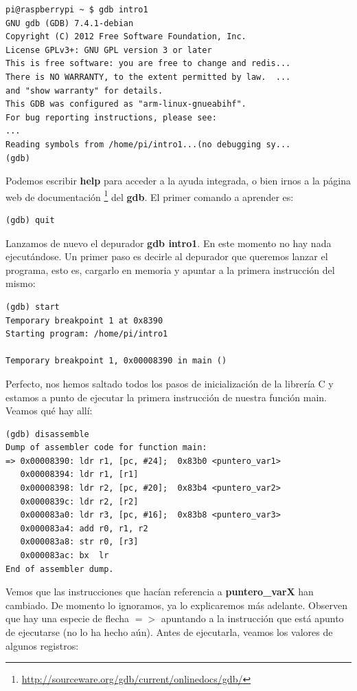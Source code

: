 \begin{lstlisting}
pi@raspberrypi ~ $ gdb intro1
GNU gdb (GDB) 7.4.1-debian
Copyright (C) 2012 Free Software Foundation, Inc.
License GPLv3+: GNU GPL version 3 or later 
This is free software: you are free to change and redis...
There is NO WARRANTY, to the extent permitted by law.  ...
and "show warranty" for details.
This GDB was configured as "arm-linux-gnueabihf".
For bug reporting instructions, please see:
...
Reading symbols from /home/pi/intro1...(no debugging sy...
(gdb)
\end{lstlisting}

Podemos escribir {\bf help} para acceder a la ayuda integrada, o bien
irnos a la página web de documentación
\footnote{\url{http://sourceware.org/gdb/current/onlinedocs/gdb/}}
del {\bf gdb}. El primer comando a aprender es:

\begin{lstlisting}
(gdb) quit
\end{lstlisting}

Lanzamos de nuevo el depurador {\bf gdb intro1}. En este momento no hay
nada ejecutándose. Un primer paso es decirle al depurador que queremos
lanzar el programa, esto es, cargarlo en memoria y apuntar a la primera
instrucción del mismo:

\begin{lstlisting}
(gdb) start
Temporary breakpoint 1 at 0x8390
Starting program: /home/pi/intro1
 
Temporary breakpoint 1, 0x00008390 in main ()
\end{lstlisting}

Perfecto, nos hemos saltado todos los pasos de inicialización de la
librería C y estamos a punto de ejecutar la primera instrucción de
nuestra función main. Veamos qué hay allí:

\begin{lstlisting}
(gdb) disassemble
Dump of assembler code for function main:
=> 0x00008390: ldr r1, [pc, #24];  0x83b0 <puntero_var1>
   0x00008394: ldr r1, [r1]
   0x00008398: ldr r2, [pc, #20];  0x83b4 <puntero_var2>
   0x0000839c: ldr r2, [r2]
   0x000083a0: ldr r3, [pc, #16];  0x83b8 <puntero_var3>
   0x000083a4: add r0, r1, r2
   0x000083a8: str r0, [r3]
   0x000083ac: bx  lr
End of assembler dump.
\end{lstlisting}

Vemos que las instrucciones que hacían referencia a {\bf puntero\_varX}
han cambiado. De momento lo ignoramos, ya lo explicaremos más adelante.
Observen que hay una especie de flecha {\bf $=>$} apuntando a la
instrucción que está apunto de ejecutarse (no lo ha hecho aún).
Antes de ejecutarla, veamos los valores de algunos registros:

